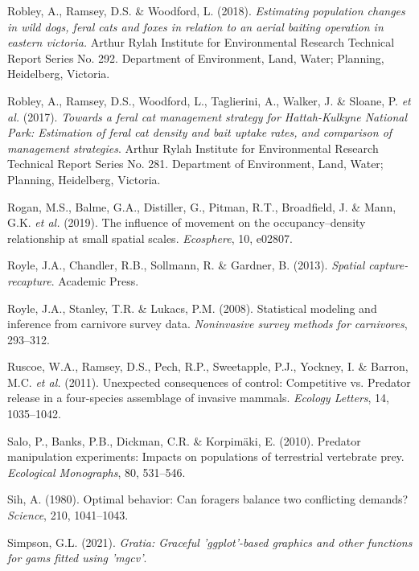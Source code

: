 \documentclass[11pt,a4paper,titlepage,twoside,openright]{style/unimelbthesis}
\begin{document}
\begin{mainmatter}
\leavevmode\hypertarget{ref-robley2018estimating}{}%
Robley, A., Ramsey, D.S. \& Woodford, L. (2018). \emph{Estimating population changes in wild dogs, feral cats and foxes in relation to an aerial baiting operation in eastern victoria.} Arthur Rylah Institute for Environmental Research Technical Report Series No. 292. Department of Environment, Land, Water; Planning, Heidelberg, Victoria.

\leavevmode\hypertarget{ref-robley2017towards}{}%
Robley, A., Ramsey, D.S., Woodford, L., Taglierini, A., Walker, J. \& Sloane, P. \emph{et al.} (2017). \emph{Towards a feral cat management strategy for Hattah-Kulkyne National Park: Estimation of feral cat density and bait uptake rates, and comparison of management strategies}. Arthur Rylah Institute for Environmental Research Technical Report Series No. 281. Department of Environment, Land, Water; Planning, Heidelberg, Victoria.

\leavevmode\hypertarget{ref-rogan2019influence}{}%
Rogan, M.S., Balme, G.A., Distiller, G., Pitman, R.T., Broadfield, J. \& Mann, G.K. \emph{et al.} (2019). The influence of movement on the occupancy--density relationship at small spatial scales. \emph{Ecosphere}, 10, e02807.

\leavevmode\hypertarget{ref-royle2013spatial}{}%
Royle, J.A., Chandler, R.B., Sollmann, R. \& Gardner, B. (2013). \emph{Spatial capture-recapture}. Academic Press.

\leavevmode\hypertarget{ref-royle2008statistical}{}%
Royle, J.A., Stanley, T.R. \& Lukacs, P.M. (2008). Statistical modeling and inference from carnivore survey data. \emph{Noninvasive survey methods for carnivores}, 293--312.

\leavevmode\hypertarget{ref-ruscoe2011unexpected}{}%
Ruscoe, W.A., Ramsey, D.S., Pech, R.P., Sweetapple, P.J., Yockney, I. \& Barron, M.C. \emph{et al.} (2011). Unexpected consequences of control: Competitive vs. Predator release in a four-species assemblage of invasive mammals. \emph{Ecology Letters}, 14, 1035--1042.

\leavevmode\hypertarget{ref-salo2010predator}{}%
Salo, P., Banks, P.B., Dickman, C.R. \& Korpimäki, E. (2010). Predator manipulation experiments: Impacts on populations of terrestrial vertebrate prey. \emph{Ecological Monographs}, 80, 531--546.

\leavevmode\hypertarget{ref-sih1980optimal}{}%
Sih, A. (1980). Optimal behavior: Can foragers balance two conflicting demands? \emph{Science}, 210, 1041--1043.

\leavevmode\hypertarget{ref-gratia}{}%
Simpson, G.L. (2021). \emph{Gratia: Graceful 'ggplot'-based graphics and other functions for gams fitted using 'mgcv'}.


\end{mainmatter}
\end{document}

